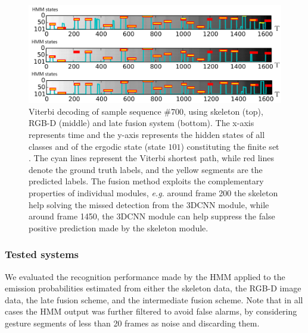 \begin{figure}[t]
\centering
    \includegraphics[width=.8\textwidth]{images/path/labelled_path2.PNG}
  \caption{
  \small{Viterbi decoding of sample sequence \#700, using skeleton (top), RGB-D (middle) and late fusion system (bottom).
The x-axis represents time and the y-axis represents the hidden states of all classes and of the ergodic state (state $101$) constituting the finite set \finiteset.
The cyan lines represent the Viterbi shortest path, while red lines denote the ground truth labels,
and the yellow segments  are the predicted labels.
The fusion method exploits the complementary properties of individual modules, \emph{e.g.} around frame 200 the skeleton
help solving  the missed detection from the 3DCNN module,
while around frame 1450, the 3DCNN module can help suppress the false positive prediction made by the skeleton module.
}}
\label{fig:Sample0700_comparison}
\end{figure}

\subsubsection{Tested systems}

We evaluated the recognition performance made by the HMM applied to the emission probabilities estimated from either
the skeleton data, the RGB-D image data, the late fusion scheme, and the intermediate fusion scheme.
%
Note that in all cases the HMM output was further filtered to avoid false alarms,
by considering gesture segments of less than 20 frames as noise and discarding them.

%


